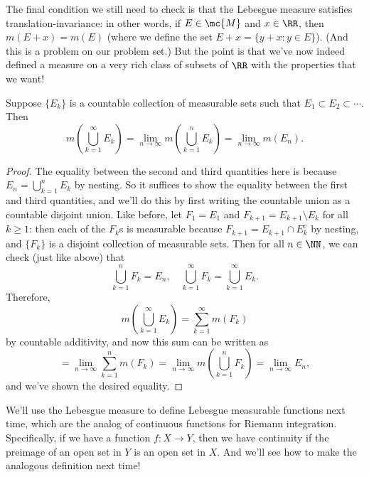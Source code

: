 The final condition we still need to check is that the Lebesgue measure satisfies translation-invariance: in other words, if $E \in \mc{M}$ and $x \in \RR$, then $m(E+x) = m(E)$ (where we define the set $E+x = \{y+x: y \in E\}$). (And this is a problem on our problem set.) But the point is that we've now indeed defined a measure on a very rich class of subsets of $\RR$ with the properties that we want!

\begin{theorem}
Suppose $\{E_k\}$ is a countable collection of measurable sets such that $E_1 \subset E_2 \subset \cdots$. Then
\[
    m\left(\bigcup_{k=1}^{\infty} E_k\right) = \lim_{n \to \infty} m\left(\bigcup_{k=1}^{n} E_k\right) = \lim_{n \to \infty} m(E_n).
\]
\end{theorem}
\begin{proof}
The equality between the second and third quantities here is because $E_n = \bigcup_{k=1}^n E_k$ by nesting. So it suffices to show the equality between the first and third quantities, and we'll do this by first writing the countable union as a countable disjoint union. Like before, let $F_1 = E_1$ and $F_{k+1} = E_{k+1} \setminus E_k$ for all $k \ge 1$: then each of the $F_k$s is measurable because $F_{k+1} = E_{k+1} \cap E_k^c$ by nesting, and $\{F_k\}$ is a disjoint collection of measurable sets. Then for all $n \in \NN$, we can check (just like above) that
\[
    \bigcup_{k=1}^n F_k = E_n, \quad \bigcup_{k=1}^{\infty} F_k = \bigcup_{k=1}^{\infty} E_k. 
\]
Therefore, 
\[
    m\left(\bigcup_{k=1}^{\infty} E_k\right) = \sum_{k=1}^{\infty} m(F_k)
\]
by countable additivity, and now this sum can be written as 
\[
    = \lim_{n \to \infty} \sum_{k=1}^n m(F_k) = \lim_{n \to \infty} m\left(\bigcup_{k=1}^n F_k\right) = \lim_{n \to \infty} E_n,
\]
and we've shown the desired equality.
\end{proof}

We'll use the Lebesgue measure to define Lebesgue measurable functions next time, which are the analog of continuous functions for Riemann integration. Specifically, if we have a function $f: X \to Y$, then we have continuity if the preimage of an open set in $Y$ is an open set in $X$. And we'll see how to make the analogous definition next time! 


